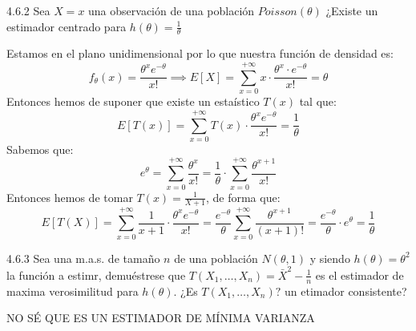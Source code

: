 \begin{problem}{4.6.2}
  Sea $X = x$ una observación de una población $Poisson(\theta)$ ¿Existe un estimador centrado para $h(\theta) = \frac{1}{\theta}$
\end{problem}
\begin{sol}
  Estamos en el plano unidimensional por lo que nuestra función de densidad es: 
  $$f_{\theta}(x) = \frac{\theta^x e^{-\theta}}{x!} \implies E[X] = \sum_{x = 0}^{+\infty} x \cdot \frac{\theta^x \cdot e^{-\theta}}{x!}= \theta$$
  Entonces hemos de suponer que existe un estaístico $T(x)$ tal que: 
  $$E[T(x)] = \sum_{x = 0}^{+\infty} T(x) \cdot \frac{\theta^x e^{-\theta}}{x!} = \frac{1}{\theta}$$
  Sabemos que: 
  $$e^{\theta} = \sum_{x = 0}^{+\infty} \frac{\theta^x}{x!} = \frac{1}{\theta} \cdot \sum_{x = 0}^{+\infty} \frac{\theta^{x+1}}{x!}$$
  Entonces hemos de tomar $T(x) = \frac{1}{X + 1}$, de forma que: 
  $$E[T(X)] = \sum_{x = 0}^{+\infty} \frac{1}{x + 1} \cdot \frac{\theta^x e^{-\theta}}{x!} = \frac{e^{-\theta}}{\theta} \sum_{x = 0}^{+\infty} \frac{\theta^{x+1}}{(x+1)!} = \frac{e^{-\theta}}{\theta} \cdot e^{\theta} = \frac{1}{\theta}$$
\end{sol}

\begin{problem}{4.6.3}
  Sea una m.a.s. de tamaño $n$ de una población $N(\theta, 1)$ y siendo $h(\theta) = \theta^2$ la función a estimr, demuéstrese que $T(X_1, \ldots, X_n) = \bar{X}^2 - \frac{1}{n}$ es el estimador de maxima verosimilitud para $h(\theta)$. ¿Es $T(X_1, \ldots, X_n)?$ un etimador consistente?
\end{problem}
\begin{sol}
  NO SÉ QUE ES UN ESTIMADOR DE MÍNIMA VARIANZA
\end{sol}


